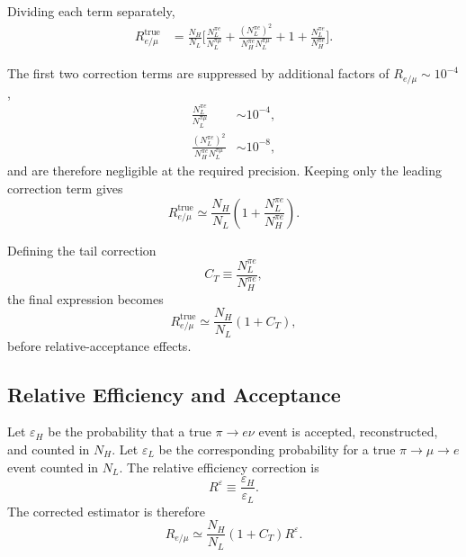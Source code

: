 Dividing each term separately,
\begin{align}
  R_{e/\mu}^{\mathrm{true}}
  &=
  \frac{N_H}{N_L}
  \Bigg[
    \frac{N_L^{\pi e}}
         {N_L^{\pi\mu}}
    +
    \frac{(N_L^{\pi e})^2}
         {N_H^{\pi e}N_L^{\pi\mu}}
    +
    1
    +
    \frac{N_L^{\pi e}}
         {N_H^{\pi e}}
  \Bigg].
\end{align}

The first two correction terms are suppressed by additional factors of
\(R_{e/\mu}\sim10^{-4}\),
\begin{align}
  \frac{N_L^{\pi e}}
       {N_L^{\pi\mu}}
  &\sim10^{-4},
  \\
  \frac{(N_L^{\pi e})^2}
       {N_H^{\pi e}N_L^{\pi\mu}}
  &\sim10^{-8},
\end{align}
and are therefore negligible at the required precision. Keeping only the
leading correction term gives
\begin{equation}
  R_{e/\mu}^{\mathrm{true}}
  \simeq
  \frac{N_H}{N_L}
  \left(
    1+
    \frac{N_L^{\pi e}}
         {N_H^{\pi e}}
  \right).
\end{equation}

Defining the tail correction
\begin{equation}
  C_T
  \equiv
  \frac{N_L^{\pi e}}
       {N_H^{\pi e}},
\end{equation}
the final expression becomes
\begin{equation}
  R_{e/\mu}^{\mathrm{true}}
  \simeq
  \frac{N_H}{N_L}
  \left(
    1+C_T
  \right),
  \label{eq:tail-corrected-remu}
\end{equation}
before relative-acceptance effects.


\subsection{Relative Efficiency and Acceptance}
\label{subsec:remu-efficiency-correction}

Let \(\varepsilon_H\) be the probability that a true \(\pi\to e\nu\) event is
accepted, reconstructed, and counted in \(N_H\). Let \(\varepsilon_L\) be the
corresponding probability for a true \(\pi\to\mu\to e\) event counted in
\(N_L\). The relative efficiency correction is
\begin{equation}
  R^\varepsilon
  \equiv
  \frac{\varepsilon_H}{\varepsilon_L}.
  \label{eq:relative-efficiency-definition}
\end{equation}
The corrected estimator is therefore
\begin{equation}
  R_{e/\mu}
  \simeq
  \frac{N_H}{N_L}
  \left(1+C_T\right)
  R^\varepsilon .
  \label{eq:remu-corrected-estimator-appendix}
\end{equation}

